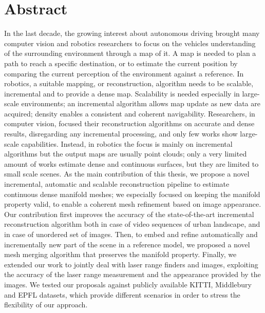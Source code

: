 \chapter*{Abstract}
\vspace{-5pt}

 

In the last decade, the growing interest about autonomous driving brought many computer vision and robotics researchers to focus on the  vehicles understanding of the surrounding environment through a map of it.
A map is needed to plan a path to reach a specific destination, or to estimate the current position by comparing the current perception of the environment against a reference.
In robotics, a suitable mapping, or reconstruction, algorithm needs  to be scalable, incremental and to provide a dense map. 
Scalability is needed especially in large-scale environments; an incremental algorithm allows map update as new data are acquired; density enables a consistent and coherent navigability.
Researchers, in computer vision, focused their reconstruction algorithms on accurate and dense results, disregarding any incremental processing, and only few works show large-scale capabilities. %
Instead, in robotics the focus is mainly on incremental algorithms but the output maps are usually point clouds; only a very limited amount of works estimate dense and continuous surfaces, but they are limited to small scale scenes.
As the main contribution of this thesis, we propose a novel incremental, automatic and scalable reconstruction  pipeline to estimate continuous dense manifold meshes; we especially focused on keeping the manifold property valid, to enable a coherent mesh refinement based on image appearance.  
Our contribution first improves the accuracy of the state-of-the-art incremental reconstruction algorithm both in case of video sequences of urban landscape, and in case of unordered set of images.
Then, to embed and refine automatically and incrementally new part of the scene in a reference  model, we proposed a novel mesh merging algorithm that preserves the manifold property.
Finally, we extended our work to jointly deal with laser range finders and images, exploiting the accuracy of the laser range measurement and the appearance provided by the images.
We tested our proposals against publicly available KITTI, Middlebury and EPFL datasets, which provide different scenarios in order to stress the flexibility of our approach.

